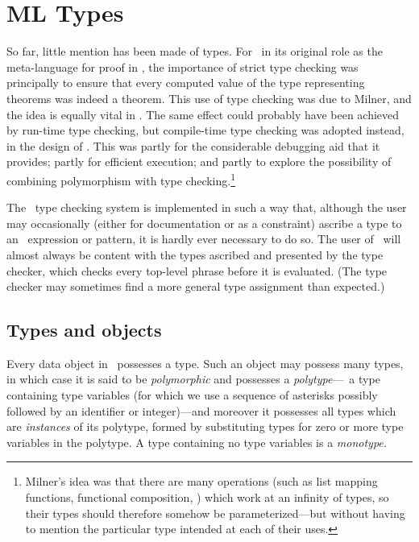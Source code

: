 \chapter {ML Types}\label{ML-types}


So far, little mention has been made of types.  For \ML\ in its 
original role as
the meta-language for proof in \LCF, the importance of strict type checking
was principally to ensure that every computed value of 
the type representing theorems was
indeed a theorem. This use of type checking was due
to Milner, and the idea is equally vital in \HOL.
The same effect could probably have been achieved by run-time
type checking, but compile-time type checking was adopted instead, in
the design of \ML.  This was
partly for the considerable debugging aid that it
provides; partly for efficient execution; and partly to explore the
possibility of combining polymorphism with type 
checking.\footnote{Milner's idea was that there are many operations
(such as list mapping functions, functional composition, \etc) which work at an
infinity of types, so their types should therefore somehow  be
parameterized---but without having to mention the
particular type intended at each of their uses.}

The \ML\ type checking
system is implemented in such a way that, although the user may
occasionally (either for documentation or as a constraint) ascribe
 a type to an
\ML\ expression or pattern, it is hardly ever necessary to do so.   The user of
\ML\ will almost always be content with the types ascribed and presented by the
type checker, which checks every top-level phrase before it is  
evaluated.  (The
type checker may sometimes find a more general type assignment than expected.)


\section {Types and objects}


Every data object in \ML\ possesses a type. Such an object may possess many
types, in which case it is said to be {\it polymorphic\/} and 
possesses a {\it polytype\/}---\ie\ a type containing type variables
(for which we use a sequence of asterisks possibly followed by an
identifier or integer)---and moreover it possesses all types which are
{\it instances\/} of its polytype, formed by substituting types for zero or
more type variables in the polytype. A type containing no type variables is
a {\it monotype.}

